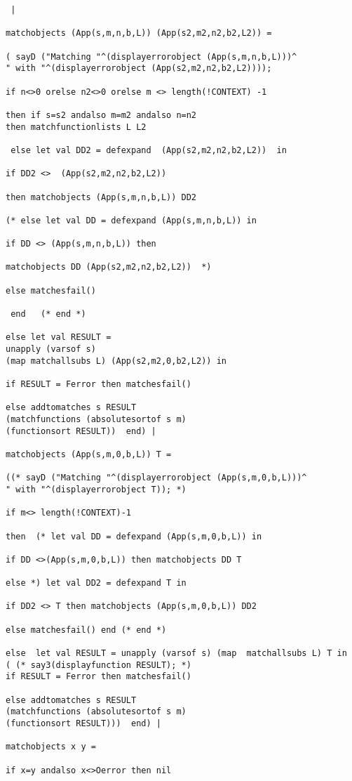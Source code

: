 \documentclass[12pt]{article}
\begin{document}
\begin{verbatim}
 |

matchobjects (App(s,m,n,b,L)) (App(s2,m2,n2,b2,L2)) =

( sayD ("Matching "^(displayerrorobject (App(s,m,n,b,L)))^
" with "^(displayerrorobject (App(s2,m2,n2,b2,L2)))); 

if n<>0 orelse n2<>0 orelse m <> length(!CONTEXT) -1 

then if s=s2 andalso m=m2 andalso n=n2 
then matchfunctionlists L L2

 else let val DD2 = defexpand  (App(s2,m2,n2,b2,L2))  in

if DD2 <>  (App(s2,m2,n2,b2,L2))  

then matchobjects (App(s,m,n,b,L)) DD2 

(* else let val DD = defexpand (App(s,m,n,b,L)) in

if DD <> (App(s,m,n,b,L)) then

matchobjects DD (App(s2,m2,n2,b2,L2))  *)

else matchesfail()

 end   (* end *)

else let val RESULT = 
unapply (varsof s) 
(map matchallsubs L) (App(s2,m2,0,b2,L2)) in

if RESULT = Ferror then matchesfail()

else addtomatches s RESULT 
(matchfunctions (absolutesortof s m) 
(functionsort RESULT))  end) |

matchobjects (App(s,m,0,b,L)) T =

((* sayD ("Matching "^(displayerrorobject (App(s,m,0,b,L)))^
" with "^(displayerrorobject T)); *)

if m<> length(!CONTEXT)-1

then  (* let val DD = defexpand (App(s,m,0,b,L)) in

if DD <>(App(s,m,0,b,L)) then matchobjects DD T

else *) let val DD2 = defexpand T in

if DD2 <> T then matchobjects (App(s,m,0,b,L)) DD2

else matchesfail() end (* end *)

else  let val RESULT = unapply (varsof s) (map  matchallsubs L) T in
( (* say3(displayfunction RESULT); *)
if RESULT = Ferror then matchesfail()

else addtomatches s RESULT 
(matchfunctions (absolutesortof s m) 
(functionsort RESULT)))  end) |

matchobjects x y = 

if x=y andalso x<>Oerror then nil 


\end{verbatim}
\end{document}

